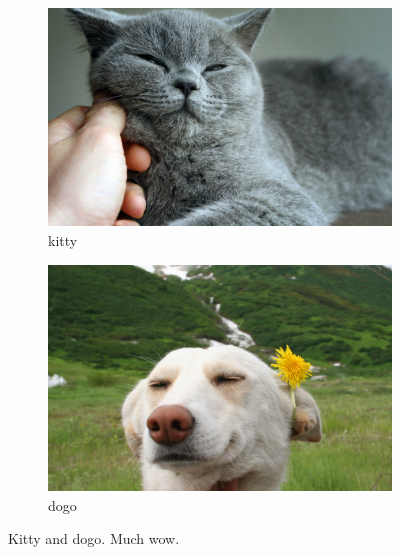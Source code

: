 \documentclass[12pt, a4paper, oneside]{article}
\begin{document}
\begin{figure}[h] %
    \centering
    \begin{subfigure}[b]{0.45\textwidth}
        \includegraphics[trim={0cm 0cm 0cm 0cm}, clip, width=\textwidth]{cat}
        \caption{kitty}
        \label{fig:blue}
    \end{subfigure}
    \hspace{2mm}
    \begin{subfigure}[b]{0.45\textwidth}
        \includegraphics[trim={0cm 0cm 0cm 0.73cm}, clip, width=\textwidth]{dog}
        \caption{dogo}
        \label{fig:red}
    \end{subfigure}
    \caption[Cat and dog]{Kitty and dogo. Much wow.}
    \label{fig:logos}
\end{figure}
\end{document}
